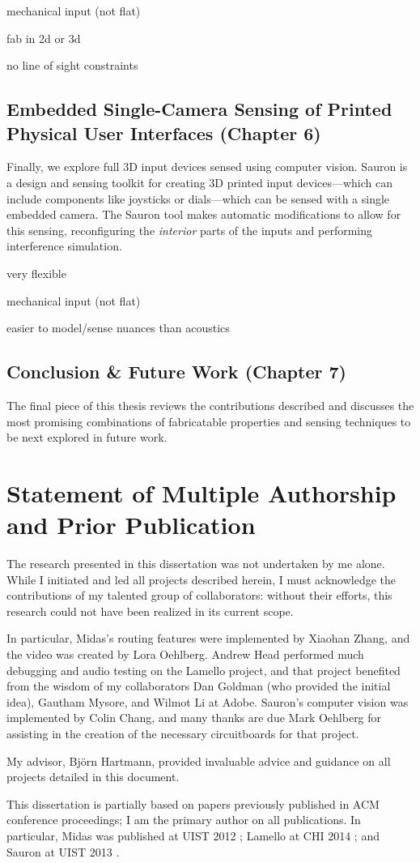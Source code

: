 mechanical input (not flat)

fab in 2d or 3d

no line of sight constraints

\subsection{Embedded Single-Camera Sensing of Printed Physical User Interfaces (Chapter 6)}

Finally, we explore full 3D input devices sensed using computer vision. Sauron is a design and sensing toolkit for creating 3D printed input devices---which can include components like joysticks or dials---which can be sensed with a single embedded camera. The Sauron tool makes automatic modifications to allow for this sensing, reconfiguring the \emph{interior} parts of the inputs and performing interference simulation.

very flexible

mechanical input (not flat)

easier to model/sense nuances than acoustics

\subsection{Conclusion \& Future Work (Chapter 7)}

The final piece of this thesis reviews the contributions described and discusses the most promising combinations of fabricatable properties and sensing techniques to be next explored in future work.

\section{Statement of Multiple Authorship and Prior Publication}

The research presented in this dissertation was not undertaken by me alone. While I initiated
and led all projects described herein, I must acknowledge the contributions of my talented group of collaborators: without their efforts, this research could not have been realized in its current scope.

In particular, Midas's routing features were implemented by Xiaohan Zhang, and the video was created by Lora Oehlberg. Andrew Head performed much debugging and audio testing on the Lamello project, and that project benefited from the wisdom of my collaborators Dan Goldman (who provided the initial idea), Gautham Mysore, and Wilmot Li at Adobe. Sauron's computer vision was implemented by Colin Chang, and many thanks are due Mark Oehlberg for assisting in the creation of the necessary circuitboards for that project.

My advisor, Bj\"orn Hartmann, provided invaluable advice and guidance on all projects detailed in this document.

This dissertation is partially based on papers previously published in ACM conference proceedings; I am the primary author on all publications. In particular, Midas was published at UIST 2012 \cite{Savage-midas}; Lamello at CHI 2014 \cite{Savage-lamello}; and Sauron at UIST 2013 \cite{Savage-sauron}.